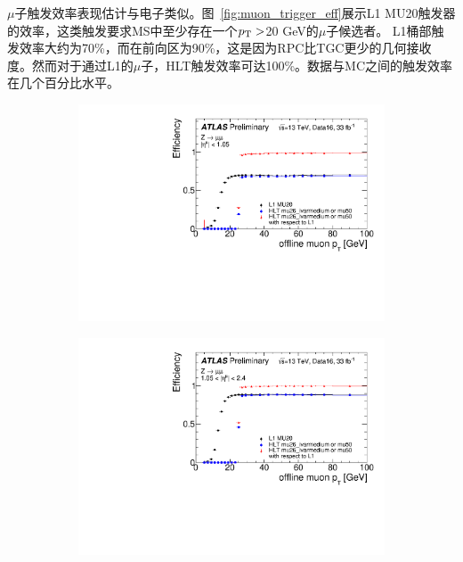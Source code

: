 $\mu$子触发效率\cite{Muon-trigger-results}表现估计与电子类似。图~\ref{fig:muon_trigger_eff}展示L1 MU20触发器的效率，这类触发要求MS中至少存在一个$p_{\text{T}}>$20 GeV的$\mu$子候选者。
L1桶部触发效率大约为70\%，而在前向区为90\%，这是因为RPC比TGC更少的几何接收度。然而对于通过L1的$\mu$子，HLT触发效率可达100\%。数据与MC之间的触发效率在几个百分比水平。
\begin{figure}[h]
\begin{center}
\begin{subfigure}[b]{0.45\textwidth}
\centering
      \includegraphics[width=\textwidth,angle=-90]{fig/HLT_mu26_ivarmedium_OR_HLT_mu50_Medium_IsoFixedCutTightTrackOnly_barrel_probe_pt_eff.pdf}
     \caption{}
      \label{fig:muon_trigger_eff_pt_barrel}
  \end{subfigure}
 \begin{subfigure}[b]{0.45\textwidth}
 \centering
      \includegraphics[width=\textwidth,angle=-90]{fig/HLT_mu26_ivarmedium_OR_HLT_mu50_Medium_IsoFixedCutTightTrackOnly_endcap_probe_pt_eff.pdf}

\end{subfigure}
\end{center}
\end{figure}
